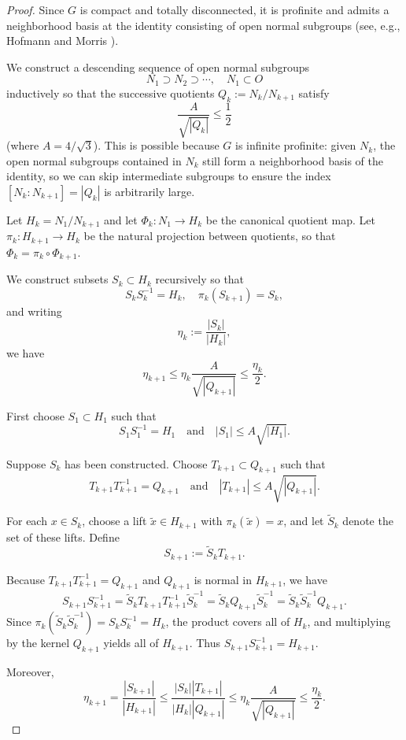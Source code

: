 \documentclass[12pt]{amsart}
\begin{document}
\begin{proof}
Since \(G\) is compact and totally disconnected,
it is profinite and admits a neighborhood basis at the identity
consisting of open normal subgroups (see, e.g., Hofmann and Morris \cite[Theorem~1.34]{HM}).

We construct a descending sequence of open normal subgroups
\[
N_1 \supset N_2 \supset \cdots,\quad N_1 \subset O
\]
inductively so that the successive quotients \(Q_k := N_k/N_{k+1}\) satisfy
\[
\frac{A}{\sqrt{|Q_k|}} \le \frac12
\]
(where \(A=4/\sqrt{3}\)). This is possible because \(G\) is infinite profinite:
given \(N_k\), the open normal subgroups contained in \(N_k\) still form a neighborhood basis of the identity, so we can skip intermediate subgroups to ensure the index \([N_k:N_{k+1}]=|Q_k|\) is arbitrarily large.

Let \(H_k = N_1/N_{k+1}\) and let \(\Phi_k : N_1 \to H_k\) be the canonical quotient map.
Let \(\pi_k : H_{k+1} \to H_k\) be the natural projection between quotients, so that \(\Phi_k = \pi_k \circ \Phi_{k+1}\).

We construct subsets \(S_k \subset H_k\) recursively so that
\[
S_k S_k^{-1} = H_k, \quad \pi_k(S_{k+1}) = S_k,
\]
and writing
\[
\eta_k := \frac{|S_k|}{|H_k|},
\]
we have
\[
\eta_{k+1} \le \eta_k \frac{A}{\sqrt{|Q_{k+1}|}} \le \frac{\eta_k}{2}.
\]

First choose \(S_1 \subset H_1\) such that
\[
S_1 S_1^{-1} = H_1 \quad\text{and}\quad |S_1| \le A \sqrt{|H_1|}.
\]

Suppose \(S_k\) has been constructed. Choose
\(T_{k+1} \subset Q_{k+1}\) such that
\[
T_{k+1} T_{k+1}^{-1} = Q_{k+1} \quad\text{and}\quad |T_{k+1}| \le A \sqrt{|Q_{k+1}|}.
\]

For each \(x \in S_k\), choose a lift \(\tilde{x} \in H_{k+1}\)
with \(\pi_k(\tilde{x}) = x\), and let \(\tilde{S}_k\) denote
the set of these lifts. Define
\[
S_{k+1} := \tilde{S}_k T_{k+1}.
\]

Because \(T_{k+1} T_{k+1}^{-1} = Q_{k+1}\) and \(Q_{k+1}\) is normal in \(H_{k+1}\), we have
\[
S_{k+1} S_{k+1}^{-1} = \tilde{S}_k T_{k+1} T_{k+1}^{-1} \tilde{S}_k^{-1} = \tilde{S}_k Q_{k+1} \tilde{S}_k^{-1} = \tilde{S}_k \tilde{S}_k^{-1} Q_{k+1}.
\]
Since \(\pi_k(\tilde{S}_k \tilde{S}_k^{-1}) = S_k S_k^{-1} = H_k\), the product covers all of \(H_k\), and multiplying by the kernel \(Q_{k+1}\) yields all of \(H_{k+1}\). Thus \(S_{k+1} S_{k+1}^{-1} = H_{k+1}\).

Moreover,
\[
\eta_{k+1} = \frac{|S_{k+1}|}{|H_{k+1}|} \le \frac{|S_k||T_{k+1}|}{|H_k||Q_{k+1}|} \le \eta_k \frac{A}{\sqrt{|Q_{k+1}|}} \le \frac{\eta_k}{2}.
\]


\end{proof}
\end{document}
